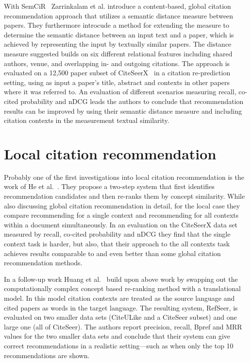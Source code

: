 With SemCiR~\cite{Zarrinkalam2013} Zarrinkalam et al. introduce a content-based, global citation recommendation approach that utilizes a semantic distance measure between papers. They furthermore introcude a method for extending the measure to determine the semantic distance between an input text and a paper, which is achieved by representing the input by textually similar papers. The distance measure suggested builds on six different relational features including shared authors, venue, and overlapping in- and outgoing citations. The approach is evaluated on a 12,500 paper subset of CiteSeerX~\cite{Caragea2014} in a citation re-prediction setting, using as input a paper's title, abstract and contexts in other papers where it was referred to. An evaluation of different scenarios measuring recall, co-cited probability and nDCG leads the authors to conclude that recommendation results can be improved by using their semantic distance measure and including citation contexts in the measurement textual similarity.





\section{Local citation recommendation}

Probably one of the first investigations into local citation recommendation is the work of He et al.~\cite{He2010}. They propose a two-step system that first identifies recommendation candidates and then re-ranks them by concept similarity. While also discussing global citation recommendation in detail, for the local case they compare recommending for a single context and recommending for all contexts within a document simultaneously. In an evaluation on the CiteSeerX data set measured by recall, co-cited probability and nDCG they find that the single context task is harder, but also, that their approach to the all contexts task achieves results comparable to and even better than some global citation recommendation methods.

In a follow-up work Huang et al.~\cite{Huang2014} build upon above work by swapping out the computationally complex concept based re-ranking method with a translational model. In this model citation contexts are treated as the source language and cited papers as words in the target language. The resulting system, RefSeer, is evaluated on two smaller data sets (CiteULike and a CiteSeer subset) and one large one (all of CiteSeer). The authors report precision, recall, Bpref and MRR values for the two smaller data sets and conclude that their system can give correct recommendations in a realistic setting---such as when only the top 10 recommendations are shown.

